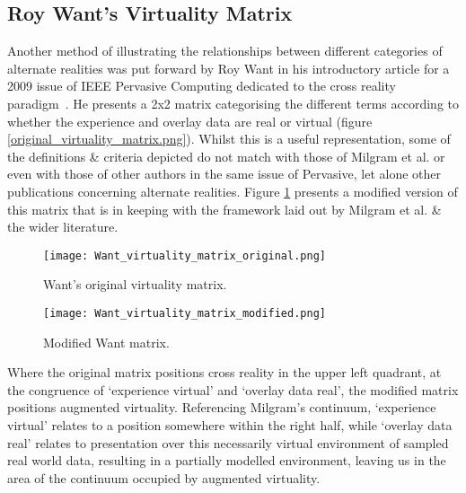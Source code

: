 \subsection{Roy Want's Virtuality Matrix}

Another method of illustrating the relationships between different categories of alternate realities was put forward by Roy Want in his introductory article for a 2009 issue of IEEE Pervasive Computing dedicated to the cross reality paradigm~\cite{Want2009}. He presents a 2x2 matrix categorising the different terms according to whether the experience and overlay data are real or virtual (figure \ref{original_virtuality_matrix.png}). Whilst this is a useful representation, some of the definitions \& criteria depicted do not match with those of Milgram et al. or even with those of other authors in the same issue of Pervasive, let alone other publications concerning alternate realities. Figure \ref{modified_virtuality_matrix.png} presents a modified version of this matrix that is in keeping with the framework laid out by Milgram et al. \& the wider literature.

\begin{figure}[h]
\centering
\begin{minipage}{.5\textwidth}
 	\centering
 	\texttt{[image: Want\_virtuality\_matrix\_original.png]}
 	\caption{Want's original virtuality matrix.}
	\label{original_virtuality_matrix.png}
\end{minipage}%
\begin{minipage}{.5\textwidth}
  \centering
  \texttt{[image: Want\_virtuality\_matrix\_modified.png]}
    \caption{Modified Want matrix.}
    \label{modified_virtuality_matrix.png}
\end{minipage}
\end{figure}

Where the original matrix positions cross reality in the upper left quadrant, at the congruence of `experience virtual' and `overlay data real', the modified matrix positions augmented virtuality. Referencing Milgram's continuum, `experience virtual' relates to a position somewhere within the right half, while `overlay data real' relates to presentation over this necessarily virtual environment of sampled real world data, resulting in a partially modelled environment, leaving us in the area of the continuum occupied by augmented virtuality.

